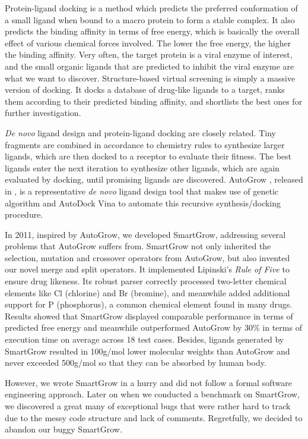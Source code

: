 \documentclass[10pt, conference, compsocconf]{IEEEtran}
\begin{document}
Protein-ligand docking is a method which predicts the preferred conformation of a small ligand when bound to a macro protein to form a stable complex. It also predicts the binding affinity in terms of free energy, which is basically the overall effect of various chemical forces involved. The lower the free energy, the higher the binding affinity. Very often, the target protein is a viral enzyme of interest, and the small organic ligands that are predicted to inhibit the viral enzyme are what we want to discover. Structure-based virtual screening is simply a massive version of docking. It docks a database of drug-like ligands to a target, ranks them according to their predicted binding affinity, and shortlists the best ones for further investigation.

\textit{De novo} ligand design and protein-ligand docking are closely related. Tiny fragments are combined in accordance to chemistry rules to synthesize larger ligands, which are then docked to a receptor to evaluate their fitness. The best ligands enter the next iteration to synthesize other ligands, which are again evaluated by docking, until promising ligands are discovered. AutoGrow \citep{466}, released in \citeyear{466}, is a representative \textit{de novo} ligand design tool that makes use of genetic algorithm and AutoDock Vina \citep{595} to automate this recursive synthesis/docking procedure.

In 2011, inspired by AutoGrow, we developed SmartGrow, addressing several problems that AutoGrow suffers from. SmartGrow not only inherited the selection, mutation and crossover operators from AutoGrow, but also invented our novel merge and split operators. It implemented Lipinski's \textit{Rule of Five} \citep{168} to ensure drug likeness. Its robust parser correctly processed two-letter chemical elements like Cl (chlorine) and Br (bromine), and meanwhile added additional support for P (phosphorus), a common chemical element found in many drugs. Results showed that SmartGrow displayed comparable performance in terms of predicted free energy and meanwhile outperformed AutoGrow by 30\% in terms of execution time on average across 18 test cases. Besides, ligands generated by SmartGrow resulted in 100g/mol lower molecular weights than AutoGrow and never exceeded 500g/mol so that they can be absorbed by human body.

However, we wrote SmartGrow in a hurry and did not follow a formal software engineering approach. Later on when we conducted a benchmark on SmartGrow, we discovered a great many of exceptional bugs that were rather hard to track due to the messy code structure and lack of comments. Regretfully, we decided to abandon our buggy SmartGrow.
\end{document}
